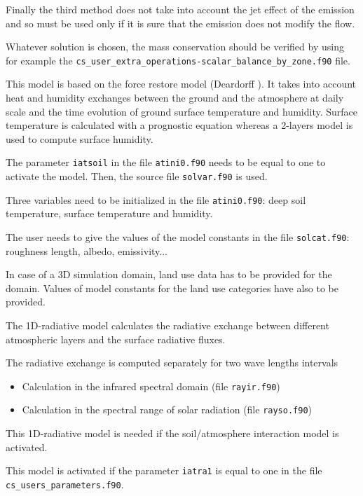 {{Finally the third method does not take into account the jet effect of the
emission and so must be used only if it is sure that the emission does not
modify the flow.

Whatever solution is chosen, the mass conservation should be verified by using
for example the
\texttt{cs\_user\_extra\_operations-scalar\_balance\_by\_zone.f90} file.


This model is based on the force restore model (Deardorff \cite{deardorff}).
It takes into account heat and humidity exchanges between the ground and the
atmosphere at daily scale and the time evolution of ground surface temperature
and humidity. Surface temperature is calculated with a prognostic equation
whereas a 2-layers model is used to compute surface humidity.

The parameter \texttt{iatsoil} in the file \texttt{atini0.f90} needs to be equal to one to
activate the model. Then, the source file \texttt{solvar.f90} is used.

Three variables need to be initialized in the file \texttt{atini0.f90}: deep soil
temperature, surface temperature and humidity.

The user needs to give the values of the model constants in the file
\texttt{solcat.f90}: roughness length, albedo, emissivity...

In case of a 3D simulation domain, land use data has to be provided for the domain.
Values of model constants for the land use categories have also to be
provided.


The 1D-radiative model calculates the radiative exchange between different
atmospheric layers and the surface radiative fluxes.

The radiative exchange is computed separately for two wave lengths intervals

\begin{itemize}
\item Calculation in the infrared spectral domain (file \texttt{rayir.f90})
\item Calculation in the spectral range of solar radiation (file
\texttt{rayso.f90})
\end{itemize}
This 1D-radiative model is needed if the soil/atmosphere interaction model
is activated.

This model is activated if the parameter \texttt{iatra1} is equal to one in the
file \texttt{cs\_users\_parameters.f90}.

}}
